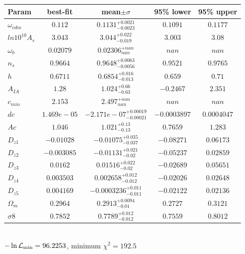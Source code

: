 \begin{tabular}{|l|c|c|c|c|} 
 \hline 
Param & best-fit & mean$\pm\sigma$ & 95\% lower & 95\% upper \\ \hline 
$\omega_{cdm }$ &$0.112$ & $0.1131_{-0.0023}^{+0.0021}$ & $0.1091$ & $0.1177$ \\ 
$ln10^{10}A_{s }$ &$3.043$ & $3.044_{-0.019}^{+0.022}$ & $3.003$ & $3.08$ \\ 
$\omega_{b }$ &$0.02079$ & $0.02306_{nan}^{+nan}$ & $nan$ & $nan$ \\ 
$n_{s }$ &$0.9664$ & $0.9648_{-0.0056}^{+0.0063}$ & $0.9521$ & $0.9765$ \\ 
$h$ &$0.6711$ & $0.6854_{-0.013}^{+0.016}$ & $0.659$ & $0.71$ \\ 
$A_{IA }$ &$1.28$ & $1.024_{-0.63}^{+0.66}$ & $-0.2467$ & $2.351$ \\ 
$c_{min }$ &$2.153$ & $2.497_{nan}^{+nan}$ & $nan$ & $nan$ \\ 
$dc$ &$1.469e-05$ & $-2.171e-07_{-0.00021}^{+0.00019}$ & $-0.0003897$ & $0.0004047$ \\ 
$Ac$ &$1.046$ & $1.021_{-0.13}^{+0.13}$ & $0.7659$ & $1.283$ \\ 
$D_{z1 }$ &$-0.01028$ & $-0.01075_{-0.037}^{+0.035}$ & $-0.08271$ & $0.06173$ \\ 
$D_{z2 }$ &$-0.003085$ & $-0.01131_{-0.02}^{+0.021}$ & $-0.05237$ & $0.02859$ \\ 
$D_{z3 }$ &$0.0162$ & $0.01516_{-0.02}^{+0.022}$ & $-0.02689$ & $0.05651$ \\ 
$D_{z4 }$ &$0.003503$ & $0.002658_{-0.012}^{+0.012}$ & $-0.02026$ & $0.02648$ \\ 
$D_{z5 }$ &$0.004169$ & $-0.0003236_{-0.011}^{+0.011}$ & $-0.02122$ & $0.02136$ \\ 
$\Omega_{m }$ &$0.2964$ & $0.2913_{-0.01}^{+0.0094}$ & $0.2727$ & $0.3121$ \\ 
$\sigma8$ &$0.7852$ & $0.7789_{-0.012}^{+0.012}$ & $0.7559$ & $0.8012$ \\ 
\hline 
 \end{tabular} \\ 
$-\ln{\cal L}_\mathrm{min} =96.2253$, minimum $\chi^2=192.5$ \\ 
